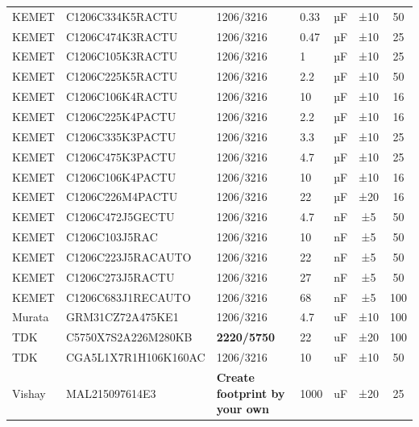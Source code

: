\begin{tabular}{lllllcc}
KEMET        & C1206C334K5RACTU & 1206/3216                 & 0.33            & µF            & ±10          & 50                \\
KEMET        & C1206C474K3RACTU & 1206/3216                 & 0.47            & µF            & ±10          & 25                \\
KEMET        & C1206C105K3RACTU & 1206/3216                 & 1               & µF            & ±10          & 25                \\
KEMET        & C1206C225K5RACTU & 1206/3216                 & 2.2             & µF            & ±10          & 50                \\
KEMET        & C1206C106K4RACTU & 1206/3216                 & 10              & µF            & ±10          & 16                \\
KEMET        & C1206C225K4PACTU & 1206/3216                 & 2.2             & µF            & ±10          & 16                \\
KEMET        & C1206C335K3PACTU & 1206/3216                 & 3.3             & µF            & ±10          & 25                \\
KEMET        & C1206C475K3PACTU & 1206/3216                 & 4.7             & µF            & ±10          & 25                \\
KEMET        & C1206C106K4PACTU & 1206/3216                 & 10              & µF            & ±10          & 16               \\
KEMET        & C1206C226M4PACTU & 1206/3216                 & 22              & µF            & ±20          & 16               \\

KEMET        & C1206C472J5GECTU & 1206/3216               & 4.7              & nF            & ±5          & 50               \\
KEMET        & C1206C103J5RAC & 1206/3216               & 10              & nF            & ±5          & 50               \\
KEMET        & C1206C223J5RACAUTO & 1206/3216               & 22              & nF            & ±5         & 50               \\
KEMET        & C1206C273J5RACTU & 1206/3216               & 27              & nF            & ±5         & 50               \\
KEMET        & C1206C683J1RECAUTO & 1206/3216               & 68              & nF            & ±5           & 100               \\

Murata       & GRM31CZ72A475KE1 & 1206/3216 & 4.7& uF& ±10 & 100\\
TDK          & C5750X7S2A226M280KB & \textbf{2220/5750} & 22&uF&±20 & 100\\
TDK                & CGA5L1X7R1H106K160AC & 1206/3216 & 10 & uF & ±10 & 50\\
	
Vishay&MAL215097614E3&\textbf{Create footprint by your own} & 1000 & uF & ±20 & 25\\
\hline
\end{tabular}
